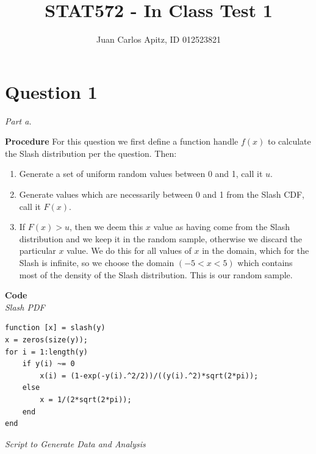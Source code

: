 \documentclass[12pt,a4paper]{article}
\author{Juan Carlos Apitz, ID 012523821}
\title{STAT572 - In Class Test 1}
\begin{document}
\maketitle

\section*{Question 1}

\textit{Part a.}

\textbf{Procedure}
For this question we first define a function handle $f(x)$ to calculate the Slash distribution per the question. Then:

\begin{enumerate}
\item{
Generate a set of uniform random values between 0 and 1, call it $u$.
}

\item{
Generate values which are necessarily between 0 and 1 from the Slash CDF, call it $F(x)$.
}

\item{
If $F(x)>u$, then we deem this $x$ value as having come from the Slash distribution and we keep it in the random sample, otherwise we discard the particular $x$ value. We do this for all values of $x$ in the domain, which for the Slash is infinite, so we choose the domain $(-5<x<5)$ which contains most of the density of the Slash distribution. This is our random sample.
}
\end{enumerate}

\textbf{Code}\\
\textit{Slash PDF}
\begin{verbatim}
function [x] = slash(y)
x = zeros(size(y));
for i = 1:length(y)
    if y(i) ~= 0
        x(i) = (1-exp(-y(i).^2/2))/((y(i).^2)*sqrt(2*pi));
    else
        x = 1/(2*sqrt(2*pi));
    end
end
\end{verbatim}

\textit{Script to Generate Data and Analysis}
\end{document}
